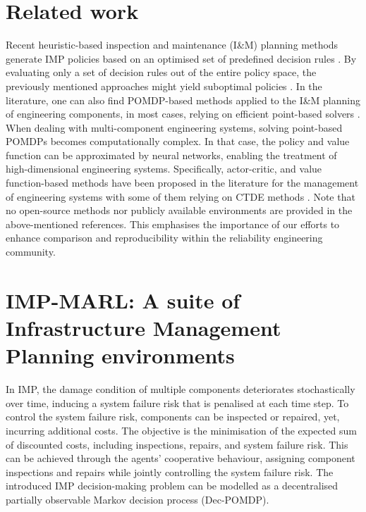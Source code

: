 \section{Related work} \label{sec:ch5_relatedwork}
Recent heuristic-based inspection and maintenance (I\&M) planning methods generate IMP policies based on an optimised set of predefined decision rules \citep{LuqueDBN2019, Bismut2019OptimalDete}.
By evaluating only a set of decision rules out of the entire policy space, the previously mentioned approaches might yield suboptimal policies \citep{morato2022optimal}.
In the literature, one can also find POMDP-based methods applied to the I\&M planning of engineering components, in most cases, relying on efficient point-based solvers \citep{Papakonstantinou2014Part1, Papakonstantinou2014Part2, morato2022optimal}. 
When dealing with multi-component engineering systems, solving point-based POMDPs becomes computationally complex.
In that case, the policy and value function can be approximated by neural networks, enabling the treatment of high-dimensional engineering systems.
Specifically, actor-critic, and value function-based methods have been proposed in the literature for the management of engineering systems \citep{Andriotis2019ManagingLearning,andriotis2021deep,morato2022syst} with some of them relying on CTDE methods \citep{nguyen2022weighted, saifullah2022deep}. Note that no open-source methods nor publicly available environments are provided in the above-mentioned references.
This emphasises the importance of our efforts to enhance comparison and reproducibility within the reliability engineering community.


\section{IMP-MARL: A suite of Infrastructure Management Planning environments} \label{sec:ch5_imp}

In IMP, the damage condition of multiple components deteriorates stochastically over time, inducing a system failure risk that is penalised at each time step.
To control the system failure risk, components can be inspected or repaired, yet, incurring additional costs.
The objective is the minimisation of the expected sum of discounted costs, including inspections, repairs, and system failure risk.
This can be achieved through the agents' cooperative behaviour, assigning component inspections and repairs while jointly controlling the system failure risk.
The introduced IMP decision-making problem can be modelled as a decentralised partially observable Markov decision process (Dec-POMDP).

